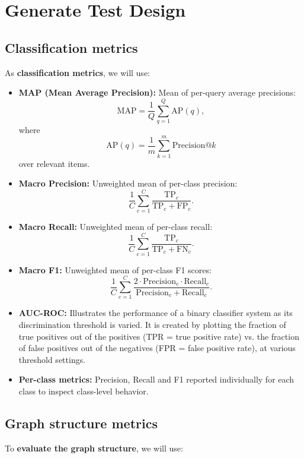 \section{Generate Test Design}

\subsection{Classification metrics}

As \textbf{classification metrics}, we will use:

\begin{itemize}
	\item \textbf{MAP (Mean Average Precision):} Mean of per-query average precisions:
	      $$\mathrm{MAP}=\frac{1}{Q}\sum_{q=1}^Q\mathrm{AP}(q),$$
	      where
	      $$\mathrm{AP}(q)=\frac{1}{m}\sum_{k=1}^m\mathrm{Precision}@k$$
	      over relevant items.
	\item \textbf{Macro Precision:} Unweighted mean of per-class precision:
	      $$\frac{1}{C}\sum_{c=1}^C\frac{\mathrm{TP}_c}{\mathrm{TP}_c+\mathrm{FP}_c}.$$
	\item \textbf{Macro Recall:} Unweighted mean of per-class recall:
	      $$\frac{1}{C}\sum_{c=1}^C\frac{\mathrm{TP}_c}{\mathrm{TP}_c+\mathrm{FN}_c}.$$
	\item \textbf{Macro F1:} Unweighted mean of per-class F1 scores:
	      $$\frac{1}{C}\sum_{c=1}^C\frac{2\cdot\mathrm{Precision}_c\cdot\mathrm{Recall}_c}{\mathrm{Precision}_c+\mathrm{Recall}_c}.$$
	\item \textbf{AUC-ROC:} Illustrates the performance of a binary classifier system as its discrimination threshold is varied. It is created by plotting the fraction of true positives out of the positives (TPR = true positive rate) vs. the fraction of false positives out of the negatives (FPR = false positive rate), at various threshold settings.
	\item \textbf{Per-class metrics:} Precision, Recall and F1 reported individually for each class to inspect class-level behavior.
\end{itemize}


\subsection{Graph structure metrics}
To \textbf{evaluate the graph structure}, we will use:

